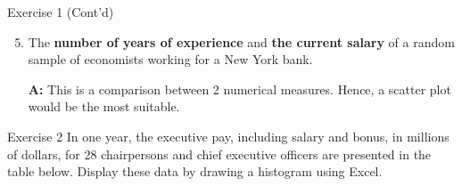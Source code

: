 \documentclass[
  ignorenonframetext,
  aspectratio=43,
]{beamer}
\let\olditem\item
\renewcommand\item{\olditem\justifying}
\begin{document}
\begin{frame}{Exercise 1 (Cont'd)}
\protect\hypertarget{exercise-1-contd-1}{}
\begin{enumerate}
\setcounter{enumi}{4}
\item
  The \textbf{number of years of experience} and \textbf{the current
  salary} of a random sample of economists working for a New York bank.

  \pause

  \textbf{A:} This is a comparison between 2 numerical measures. Hence,
  a scatter plot would be the most suitable.
\end{enumerate}
\end{frame}

\begin{frame}{Exercise 2}
\protect\hypertarget{exercise-2}{}
In one year, the executive pay, including salary and bonus, in millions
of dollars, for 28 chairpersons and chief executive officers are
presented in the table below. Display these data by drawing a histogram
using Excel. \vspace{10pt}

\begin{table}
\centering
\tiny
{}
\end{table}
\end{frame}
\end{document}
